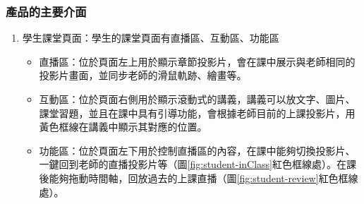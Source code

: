\subsubsection{產品的主要介面}

\begin{enumerate}
  \setlength{\parindent}{2em}

  \item 學生課堂頁面：學生的課堂頁面有直播區、互動區、功能區
  \begin{itemize}
    \item 直播區：位於頁面左上用於顯示章節投影片，會在課中展示與老師相同的投影片畫面，並同步老師的滑鼠軌跡、繪畫等。
    \item 互動區：位於頁面右側用於顯示滾動式的講義，講義可以放文字、圖片、課堂習題，並且在課中具有引導功能，會根據老師目前的上課投影片，用黃色框線在講義中顯示其對應的位置。
    \item 功能區：位於頁面左下用於控制直播區的內容，在課中能夠切換投影片、一鍵回到老師的直播投影片等（圖\ref{fig:student-inClass}紅色框線處）。在課後能夠拖動時間軸，回放過去的上課直播（圖\ref{fig:student-review}紅色框線處）。
  \end{itemize}


\end{enumerate}
